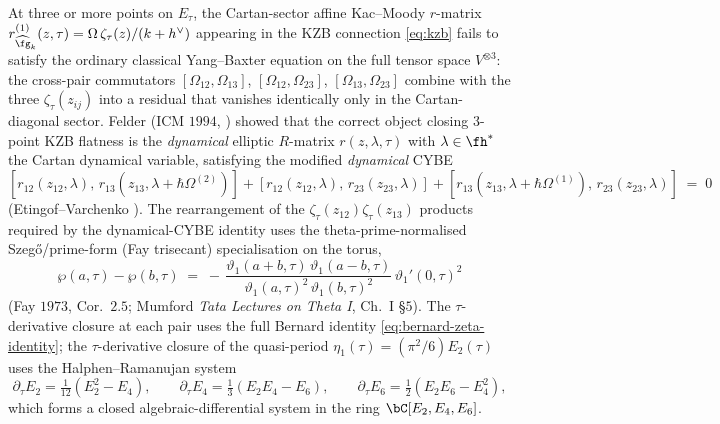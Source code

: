 \begin{remark}
\label{rem:kzb-n-point-dynamical-closure}
\ClaimStatusProvedElsewhere
{}
At three or more points on $E_\tau$, the Cartan-sector affine
Kac--Moody $r$-matrix $r_{\widehat{\fg}_k}^{(1)}(z,\tau) =
\Omega\,\zeta_\tau(z)/(k+h^\vee)$ appearing in the KZB connection
\eqref{eq:kzb} fails to satisfy the ordinary classical Yang--Baxter
equation on the full tensor space $V^{\otimes 3}$: the cross-pair
commutators $[\Omega_{12},\Omega_{13}]$, $[\Omega_{12},\Omega_{23}]$,
$[\Omega_{13},\Omega_{23}]$ combine with the three
$\zeta_\tau(z_{ij})$ into a residual that vanishes identically only
in the Cartan-diagonal sector. Felder \textup{(}ICM $1994$,
\cite{Felder94}\textup{)} showed that the correct object closing
$3$-point KZB flatness is the \emph{dynamical} elliptic $R$-matrix
$r(z,\lambda,\tau)$ with $\lambda \in \fh^*$ the Cartan dynamical
variable, satisfying the modified \emph{dynamical} CYBE
\[
[r_{12}(z_{12},\lambda),\,r_{13}(z_{13},\lambda + \hbar \Omega^{(2)})]
+ [r_{12}(z_{12},\lambda),\,r_{23}(z_{23},\lambda)]
+ [r_{13}(z_{13},\lambda+\hbar\Omega^{(1)}),\,r_{23}(z_{23},\lambda)]
\;=\; 0
\]
(Etingof--Varchenko \cite{EV98}). The rearrangement of the
$\zeta_\tau(z_{12})\zeta_\tau(z_{13})$ products required by the
dynamical-CYBE identity uses the theta-prime-normalised
Szeg\H{o}/prime-form \textup{(}Fay trisecant\textup{)}
specialisation on the torus,
\[
\wp(a,\tau) - \wp(b,\tau)
\;=\; -\,\frac{\vartheta_1(a+b,\tau)\,\vartheta_1(a-b,\tau)}
 {\vartheta_1(a,\tau)^2\,\vartheta_1(b,\tau)^2}
 \,\vartheta_1'(0,\tau)^2
\]
\textup{(}Fay $1973$, Cor.~$2.5$; Mumford \emph{Tata Lectures on
Theta I}, Ch.~I \S $5$\textup{)}. The
$\tau$-derivative closure at each pair uses the full Bernard
identity \eqref{eq:bernard-zeta-identity}; the $\tau$-derivative
closure of the quasi-period $\eta_1(\tau) = (\pi^2/6) E_2(\tau)$
uses the Halphen--Ramanujan system
\[
\partial_\tau E_2 = \tfrac{1}{12}(E_2^2 - E_4),\qquad
\partial_\tau E_4 = \tfrac{1}{3}(E_2 E_4 - E_6),\qquad
\partial_\tau E_6 = \tfrac{1}{2}(E_2 E_6 - E_4^2),
\]
which forms a closed algebraic-differential system in the ring
$\bC[E_2, E_4, E_6]$.


\end{remark}
